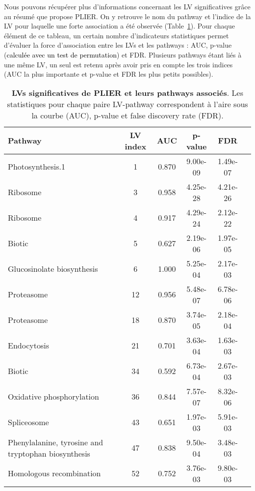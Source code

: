 \documentclass[twoside]{article}
\newcommand{\AR}[1]{\textcolor{black}{#1}}
\begin{document}
\vspace{0.5cm}Nous pouvons récupérer plus d'informations concernant les LV significatives grâce au résumé que propose PLIER. On y retrouve le nom du pathway et l'indice de la LV pour laquelle une forte association a été observée (Table~\ref{tab:lvs}). Pour chaque élément de ce tableau, un certain nombre d'indicateurs statistiques permet d'évaluer la force d'association entre les LVs et les pathways : AUC, p-value (\AR{calculée avec un test de permutation}) et FDR. Plusieurs pathways étant liés à une même LV, un seul est retenu après avoir pris en compte les trois indices (AUC la plus importante et p-value et FDR les plus petits possibles).

    \begin{table}[!h]
    \centering
        \begin{tabular}{lccccc}
        \hline
          Pathway & LV index & AUC & p-value & FDR\\
        \hline
        Photosynthesis.1 & 1 & 0.870 & 9.00e-09 & 1.49e-07\\
        Ribosome & 3 & 0.958 & 4.25e-28 & 4.21e-26\\
        Ribosome & 4 & 0.917 & 4.29e-24 & 2.12e-22\\
        Biotic & 5 & 0.627 & 2.19e-06 & 1.97e-05\\
        Glucosinolate biosynthesis & 6 & 1.000 & 5.25e-04 & 2.17e-03\\
        Proteasome & 12 & 0.956 & 5.48e-07 & 6.78e-06\\
        Proteasome & 18 & 0.870 & 3.74e-05 & 2.18e-04\\
        Endocytosis & 21 & 0.701 & 3.63e-04 & 1.63e-03\\
        Biotic & 34 & 0.592 & 6.73e-04 & 2.67e-03\\
        Oxidative phosphorylation & 36 & 0.844 & 7.57e-07 & 8.32e-06\\
        Spliceosome & 43 & 0.651 & 1.97e-03 & 5.91e-03\\
        Phenylalanine, tyrosine and tryptophan biosynthesis & 47 & 0.838 & 9.50e-04 & 3.48e-03\\
        Homologous recombination & 52 & 0.752 & 3.76e-03 & 9.80e-03\\
        \hline
        \end{tabular}
        \caption[LVs significatives de PLIER et leurs pathways associés]{\label{tab:LV-sig}\textbf{LVs significatives de PLIER et leurs pathways associés}. Les statistiques pour chaque paire LV-pathway correspondent à l'aire sous la courbe (AUC), p-value et false discovery rate (FDR).\label{tab:lvs}}
    \end{table}
\end{document}
